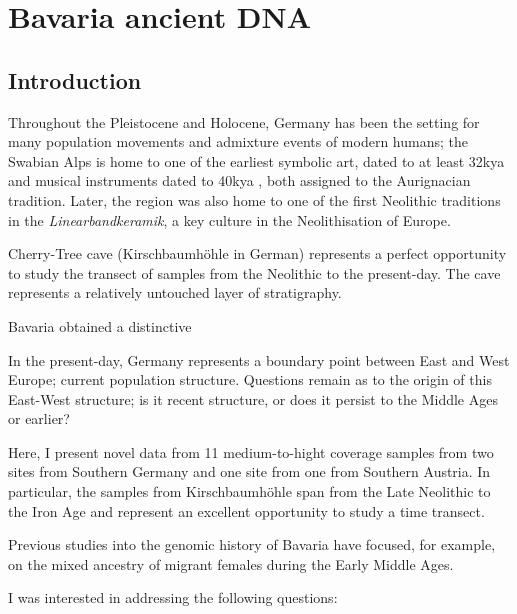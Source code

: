 \chapter{Bavaria ancient DNA}
\label{chapterlabel4}

\section{Introduction}


Throughout the Pleistocene and Holocene, Germany has been the setting for many population movements and admixture events of modern humans; the Swabian Alps is home to one of the earliest symbolic art, dated to at least 32kya \cite{conard2009female} and musical instruments dated to 40kya \cite{conard2009new}, both assigned to the Aurignacian tradition. Later, the region was also home to one of the first Neolithic traditions in the \textit{Linearbandkeramik}, a key culture in the Neolithisation of Europe. 

Cherry-Tree cave (Kirschbaumhöhle in German) represents a perfect opportunity to study the transect of samples from the Neolithic to the present-day. The cave represents a relatively untouched layer of stratigraphy.

Bavaria obtained a distinctive 

In the present-day, Germany represents a boundary point between East and West Europe; current population structure. Questions remain as to the origin of this East-West structure; is it recent structure, or does it persist to the Middle Ages or earlier? 

Here, I present novel data from 11 medium-to-hight coverage samples from two sites from Southern Germany and one site from one from Southern Austria. In particular, the samples from Kirschbaumhöhle span from the Late Neolithic to the Iron Age and represent an excellent opportunity to study a time transect. 

Previous studies into the genomic history of Bavaria have focused, for example, on the mixed ancestry of migrant females during the Early Middle Ages. 

I was interested in addressing the following questions:

